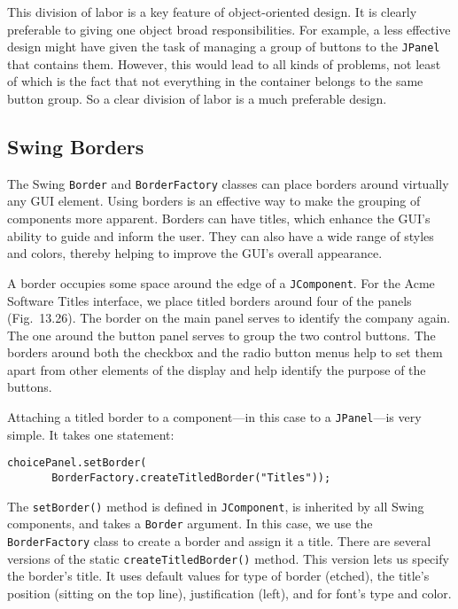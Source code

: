 This division of labor is a key feature of object-oriented design. It
is clearly preferable to giving one object broad responsibilities.
For example, a less effective design might have given the task of
managing a group of buttons to the {\tt JPanel} that contains them.
However, this would lead to all kinds of problems, not least of which
is the fact that not everything in the container belongs to the same
button group. So a clear division of labor is a much preferable
design.


\subsection{Swing Borders}
\noindent The Swing {\tt Border} and {\tt BorderFactory} classes can place
borders around virtually any GUI element. Using borders is an
effective way to make the grouping of components more
apparent. Borders can have titles, which enhance the GUI's ability to
guide and inform the user. They can also have a wide range of styles
and colors, thereby helping to improve the GUI's overall appearance.



A border occupies some space around the edge of a
{\tt JComponent}. For the Acme Software Titles interface, we place titled borders around
four of the panels (Fig.~13.26). The border on the
main panel serves to identify the company again. The one around the
button panel serves to group the two control buttons. The borders
around both the checkbox and the radio button menus help to set them
apart from other elements of the display and help identify the
purpose of the buttons.


Attaching a titled border to a component---in this case to a
{\tt JPanel}---is very simple. It takes one statement:

\begin{jjjlisting}
\begin{lstlisting}
choicePanel.setBorder(
       BorderFactory.createTitledBorder("Titles"));
\end{lstlisting}
\end{jjjlisting}

\noindent The {\tt setBorder()} method is defined in {\tt JComponent},
is inherited by all Swing components, and takes a {\tt Border}
argument. In this case, we use the {\tt BorderFactory} class to create
a border and assign it a title.  There are several versions of the static
{\tt createTitledBorder()} method. This version lets us specify the
border's title. It uses default values for type of border (etched),
the title's position (sitting on the top line), justification
(left), and for font's type and color.

